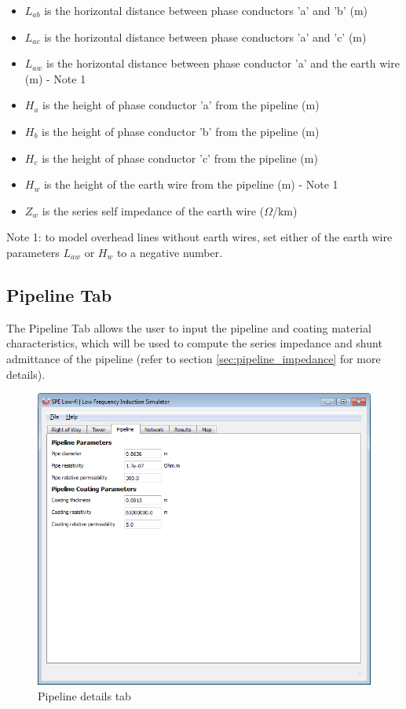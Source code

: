 \documentclass{article}
\begin{document}
\begin{itemize}
\item $L_{ab}$ is the horizontal distance between phase conductors 'a' and 'b' (m)
\item $L_{ac}$ is the horizontal distance between phase conductors 'a' and 'c' (m)
\item $L_{aw}$ is the horizontal distance between phase conductor 'a' and the earth wire (m) - Note 1
\item $H_a$ is the height of phase conductor 'a' from the pipeline (m)
\item $H_b$ is the height of phase conductor 'b' from the pipeline (m)
\item $H_c$ is the height of phase conductor 'c' from the pipeline (m)
\item $H_w$ is the height of the earth wire from the pipeline (m) - Note 1
\item $Z_w$ is the series self impedance of the earth wire ($\Omega$/km)
\end{itemize}

Note 1: to model overhead lines without earth wires, set either of the earth wire parameters $L_{aw}$ or $H_w$ to a negative number.

\subsection{Pipeline Tab}
The Pipeline Tab allows the user to input the pipeline and coating material characteristics, which will be used to compute the series impedance and shunt admittance of the pipeline (refer to section \ref{sec:pipeline_impedance} for more details).

\begin{figure}[!htp]
\begin{center}
\caption{Pipeline details tab}
\label{fig:pipeline}
\includegraphics[width=0.9\linewidth]{./Figures/pipeline.png}
\end{center}
\end{figure}
\end{document}
